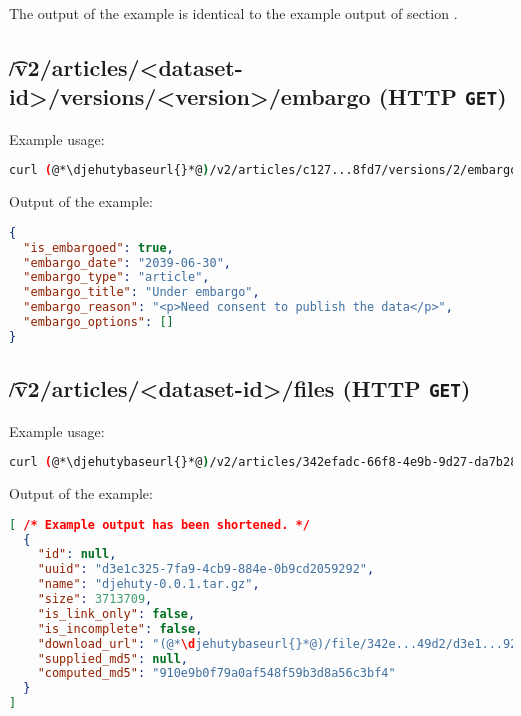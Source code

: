   The output of the example is identical to the example output of section
  .

\subsection{\t{/v2/articles/<dataset-id>/versions/<version>/embargo} (HTTP \texttt{GET})}

  Example usage:
\begin{lstlisting}[language=bash]
curl (@*\djehutybaseurl{}*@)/v2/articles/c127...8fd7/versions/2/embargo | jq
\end{lstlisting}

  Output of the example:
\begin{lstlisting}[language=JSON]
{
  "is_embargoed": true,
  "embargo_date": "2039-06-30",
  "embargo_type": "article",
  "embargo_title": "Under embargo",
  "embargo_reason": "<p>Need consent to publish the data</p>",
  "embargo_options": []
}
\end{lstlisting}


\subsection{\t{/v2/articles/<dataset-id>/files} (HTTP \texttt{GET})}


  Example usage:
\begin{lstlisting}[language=bash]
curl (@*\djehutybaseurl{}*@)/v2/articles/342efadc-66f8-4e9b-9d27-da7b28b849d2/files
\end{lstlisting}

  Output of the example:
\begin{lstlisting}[language=JSON]
[ /* Example output has been shortened. */
  {
    "id": null,
    "uuid": "d3e1c325-7fa9-4cb9-884e-0b9cd2059292",
    "name": "djehuty-0.0.1.tar.gz",
    "size": 3713709,
    "is_link_only": false,
    "is_incomplete": false,
    "download_url": "(@*\djehutybaseurl{}*@)/file/342e...49d2/d3e1...9292",
    "supplied_md5": null,
    "computed_md5": "910e9b0f79a0af548f59b3d8a56c3bf4"
  }
]
\end{lstlisting}

